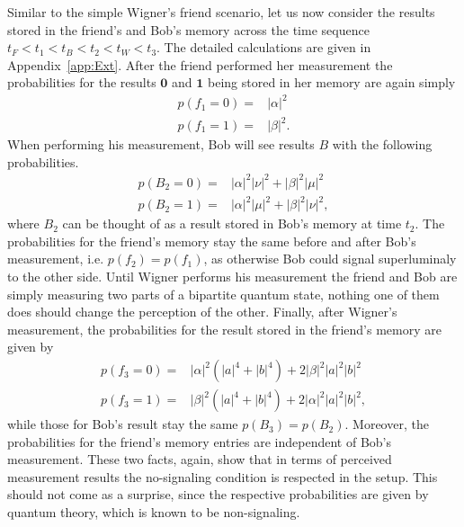\documentclass[a4paper,twocolumn,11pt,accepted=2017-05-09,dvipsnames]{quantumarticle}
\numberwithin{equation}{section}
\begin{document}
Similar to the simple Wigner's friend scenario, let us now consider the results stored in the friend's and Bob's memory across the time sequence $t_F<t_1<t_B<t_2<t_W<t_3$. The detailed calculations are given in Appendix~\ref{app:Ext}. After the friend performed her measurement the probabilities for the results $\bm 0$ and $\bm 1$ being stored in her memory are again simply
\begin{align}
\label{t1_0}
p(f_1=0)=& |\alpha|^2  \\
\label{t1_1}
p(f_1=1)=& |\beta|^2 . 
\end{align}
When performing his measurement, Bob will see results $B$ with the following probabilities.
\begin{align}
\label{t2_b0}
p(B_2=0)=& |\alpha|^2 |\nu|^2+|\beta|^2|\mu|^2  \\
\label{t2_b1}
p(B_2=1)=& |\alpha|^2 |\mu|^2+|\beta|^2|\nu|^2 ,  
\end{align}
where $B_2$ can be thought of as a result stored in Bob's memory at time $t_2$. The probabilities for the friend's memory stay the same  before and after Bob's measurement, i.e. $p(f_2)=p(f_1)$, as otherwise Bob could signal superluminaly to the other side. Until Wigner performs his measurement the friend and Bob are simply measuring two parts of a bipartite quantum state, nothing one of them does should change the perception of the other. %
Finally, after Wigner's measurement, the probabilities for the result stored in the friend's memory are given by
\begin{align}
\label{t3_0}
p(f_3=0)=& |\alpha|^2 (|a|^4+|b|^4)+2|\beta|^2|a|^2|b|^2 \\
\label{t3_1}
p(f_3=1)=&  |\beta|^2 (|a|^4+|b|^4)+2|\alpha|^2|a|^2|b|^2 ,  
\end{align}
while those for Bob's result stay the same $p(B_3)=p(B_2)$. Moreover, the probabilities for the friend's memory entries are independent of Bob's measurement. These two facts, again, show that in terms of perceived measurement results the no-signaling condition is respected in the setup. This should not come as a surprise, since the respective probabilities are given by quantum theory, which is known to be non-signaling. \\
\end{document}
